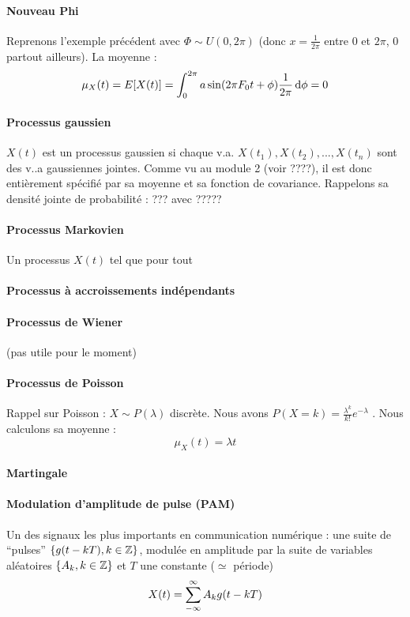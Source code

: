 \documentclass[11pt,a4paper]{article}
\numberwithin{equation}{section}
\begin{document}
\paragraph{Nouveau Phi} 
   Reprenons l'exemple précédent avec $\Phi \sim U(0,2\pi)$ (donc $x = \frac{1}{2\pi}$ entre 0 et $2\pi$, 0 partout ailleurs). La moyenne :
    \[\mu_X(t) = E[X(t)] = \int_0^{2\pi} a\sin(2\pi F_0 t + \phi)\frac{1}{2\pi} \, \mathrm d \phi = 0\]
\paragraph{Processus gaussien}
    $X(t)$ est un processus gaussien si chaque v.a. $X(t_1),X(t_2),...,X(t_n)$ sont des v..a gaussiennes jointes. Comme vu au module 2 (voir ????), il est donc entièrement spécifié par sa moyenne et sa fonction de covariance. Rappelons sa densité jointe de probabilité :
    ???
    avec ?????
\paragraph{Processus Markovien}
Un processus $X(t)$ tel que pour tout 

\paragraph{Processus à accroissements indépendants}    

\paragraph{Processus de Wiener}
(pas utile pour le moment)

\paragraph{Processus de Poisson}
Rappel sur Poisson : $X \sim P(\lambda)$ discrète. Nous avons $P(X=k) = \frac{\lambda^k}{k!}e^{-\lambda}$ . Nous calculons sa moyenne : 
\[\mu_X(t) = \lambda t\]

\paragraph{Martingale}

\paragraph{Modulation d'amplitude de pulse (PAM)}
Un des signaux les plus importants en communication numérique : une suite de ``pulses'' $\{g(t-kT),k\in \mathbb{Z}\}$, modulée en amplitude par la suite de variables aléatoires $\{A_k, k \in \mathbb{Z}\}$ et $T$ une constante ($\simeq$ période)
\begin{equation}
    X(t) = \sum\limits_{-\infty}^{\infty} A_k g(t-kT)
    \label{equ:PAM}
\end{equation}
\end{document}
